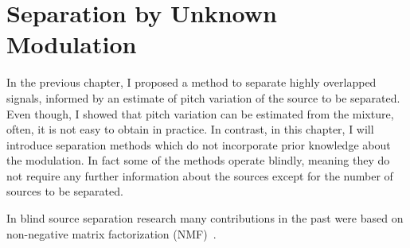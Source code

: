 \chapter{Separation by Unknown Modulation}
\label{cha:unknown}

In the previous chapter, I proposed a method to separate highly overlapped signals, informed by an estimate of pitch variation of the source to be separated.
Even though, I showed that pitch variation can be estimated from the mixture, often, it is not easy to obtain in practice.
In contrast, in this chapter, I will introduce separation methods which do not incorporate prior knowledge about the modulation. 
In fact some of the methods operate blindly, meaning they do not require any further information about the sources except for the number of sources to be separated.
\par
In blind source separation research many contributions in the past were based on non-negative matrix factorization (NMF)~\cite{lee99, lee01}.

